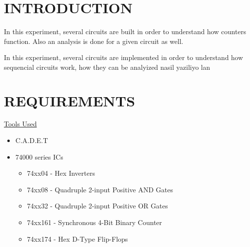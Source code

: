 \documentclass[pdftex,12pt,a4paper]{article}
\begin{document}
\setcounter{page}{1}

\section{INTRODUCTION}
\begin{flushleft}
\paragraph {}
In this experiment, several circuits are built in order to understand how counters function. Also an analysis is done for a given circuit as well.

In this experiment, several circuits are implemented in order to understand how sequencial circuits work, how they can be analyized nasil yaziliyo lan 

\end{flushleft}

\section{REQUIREMENTS}
\begin{flushleft}
\underline{Tools Used}\cite{booklet}
\end{flushleft}

\begin{itemize}
    \item C.A.D.E.T
    \item 74000 series ICs
    \begin{itemize}
        \item 74xx04 - Hex Inverters
        \item 74xx08 - Quadruple 2-input Positive AND Gates
        \item 74xx32 - Quadruple 2-input Positive OR Gates
        \item 74xx161 - Synchronous 4-Bit Binary Counter
        \item 74xx174 - Hex D-Type Flip-Flops
    \end{itemize}
\end{itemize}
\end{document}
